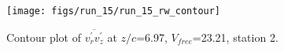 \begin{figure}[H]
\centering
\texttt{[image: figs/run\_15/run\_15\_rw\_contour]}
\caption{Contour plot of $\overline{v_{r}^{\prime} v_{z}^{\prime}}$ at $z/c$=6.97, $V_{free}$=23.21, station 2.}
\label{fig:run_15_rw_contour}
\end{figure}


